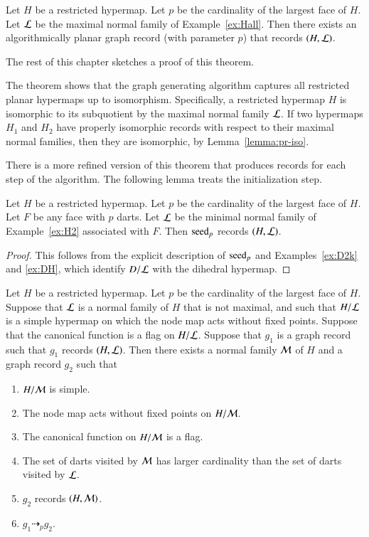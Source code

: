 \begin{theorem}\label{lemma:bn}
  Let $H$ be a restricted hypermap.  Let $p$ be the cardinality of the
  largest face of $H$. Let ${\cal L}$ be the maximal normal family of
  Example~\ref{ex:Hall}.  Then there exists an algorithmically planar
  graph record (with parameter $p$) that records $(H,{\cal L})$.
\end{theorem}

The rest of this chapter sketches a proof of this theorem.

The theorem shows that the graph generating algorithm captures all
restricted planar hypermaps up to isomorphism.  Specifically, a
restricted hypermap $H$ is isomorphic to its subquotient by the maximal
normal family ${\cal L}$.  If two hypermaps $H_1$ and $H_2$ have
properly isomorphic records with respect to their maximal normal
families, then they are isomorphic, by Lemma~\ref{lemma:pr-iso}.


There is a more refined version of this theorem that produces records for each
step of the algorithm.  The following lemma treats the initialization step.

\begin{lemma}\label{lemma:algo-init}
  Let $H$ be a restricted hypermap.  Let $p$ be the cardinality of the
  largest face of $H$.  Let $F$ be any face with $p$ darts.  Let
  ${\cal L}$ be the minimal normal family of Example~\ref{ex:H2}
  associated with $F$.  Then ${\operatorname{seed}}_p$ records $(H,{\cal L})$.
\end{lemma}

\begin{proof}
  This follows from the explicit description of ${\operatorname{seed}}_p$ and
  Examples~\ref{ex:D2k} and \ref{ex:DH}, which identify $D/{\cal L}$
  with the dihedral hypermap.
\end{proof}


\begin{lemma}\label{lemma:algo-step}  
  Let $H$ be a restricted hypermap.  Let $p$ be the cardinality of the
  largest face of $H$.  Suppose that ${\cal L}$ is a normal family of
  $H$ that is not maximal, and such that $H/{\cal L}$ is a simple
  hypermap on which the node map acts without fixed points.  Suppose
  that the canonical function is a flag on $H/{\cal L}$.  Suppose that
  $g_1$ is a graph record such that $g_1$ records $(H,{\cal L})$.
  Then there exists a normal family ${\cal M}$ of $H$ and a graph
  record $g_2$ such that
\begin{enumerate}
\item $H/{\cal M}$ is simple.
\item The node map acts without fixed points on $H/{\cal M}$.
\item The canonical function on $H/{\cal M}$ is a flag.
\item The set of darts visited by ${\cal M}$ has larger cardinality than the set of
darts visited by ${\cal L}$.
\item $g_2$ records $(H,{\cal M})$.
\item $g_1 \dashrightarrow_p g_2$.
\end{enumerate}
\end{lemma}

